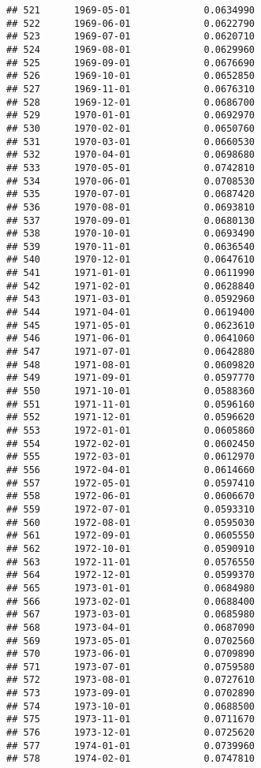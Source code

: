 \documentclass[
]{article}
\begin{document}
\begin{verbatim}
## 521      1969-05-01             0.0634990
## 522      1969-06-01             0.0622790
## 523      1969-07-01             0.0620710
## 524      1969-08-01             0.0629960
## 525      1969-09-01             0.0676690
## 526      1969-10-01             0.0652850
## 527      1969-11-01             0.0676310
## 528      1969-12-01             0.0686700
## 529      1970-01-01             0.0692970
## 530      1970-02-01             0.0650760
## 531      1970-03-01             0.0660530
## 532      1970-04-01             0.0698680
## 533      1970-05-01             0.0742810
## 534      1970-06-01             0.0708530
## 535      1970-07-01             0.0687420
## 536      1970-08-01             0.0693810
## 537      1970-09-01             0.0680130
## 538      1970-10-01             0.0693490
## 539      1970-11-01             0.0636540
## 540      1970-12-01             0.0647610
## 541      1971-01-01             0.0611990
## 542      1971-02-01             0.0628840
## 543      1971-03-01             0.0592960
## 544      1971-04-01             0.0619400
## 545      1971-05-01             0.0623610
## 546      1971-06-01             0.0641060
## 547      1971-07-01             0.0642880
## 548      1971-08-01             0.0609820
## 549      1971-09-01             0.0597770
## 550      1971-10-01             0.0588360
## 551      1971-11-01             0.0596160
## 552      1971-12-01             0.0596620
## 553      1972-01-01             0.0605860
## 554      1972-02-01             0.0602450
## 555      1972-03-01             0.0612970
## 556      1972-04-01             0.0614660
## 557      1972-05-01             0.0597410
## 558      1972-06-01             0.0606670
## 559      1972-07-01             0.0593310
## 560      1972-08-01             0.0595030
## 561      1972-09-01             0.0605550
## 562      1972-10-01             0.0590910
## 563      1972-11-01             0.0576550
## 564      1972-12-01             0.0599370
## 565      1973-01-01             0.0684980
## 566      1973-02-01             0.0688400
## 567      1973-03-01             0.0685980
## 568      1973-04-01             0.0687090
## 569      1973-05-01             0.0702560
## 570      1973-06-01             0.0709890
## 571      1973-07-01             0.0759580
## 572      1973-08-01             0.0727610
## 573      1973-09-01             0.0702890
## 574      1973-10-01             0.0688500
## 575      1973-11-01             0.0711670
## 576      1973-12-01             0.0725620
## 577      1974-01-01             0.0739960
## 578      1974-02-01             0.0747810

\end{verbatim}
\end{document}
